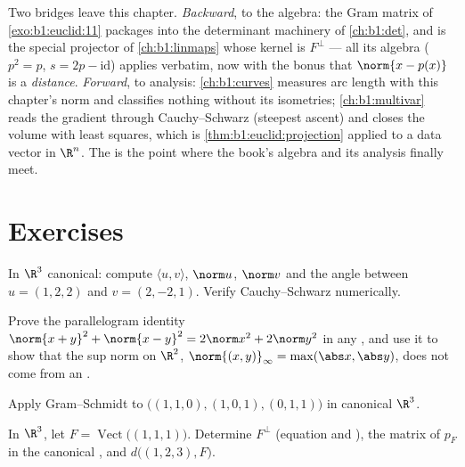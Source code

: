\begin{remark}
\label{rem:b1:euclid:perspectives}
Two bridges leave this chapter. \emph{Backward}, to the 
algebra: the Gram matrix of \cref{exo:b1:euclid:11} packages
 into the determinant machinery of
\cref{ch:b1:det}, and  is the special
projector of \cref{ch:b1:linmaps} whose kernel is
$F^\perp$ --- all its algebra ($p^2 = p$, $s = 2p -
\mathrm{id}$) applies verbatim, now with the bonus that $\norm{x
- p(x)}$ is a \emph{distance}. \emph{Forward}, to analysis:
\cref{ch:b1:curves} measures arc length with this chapter's
norm and classifies nothing without its isometries;
\cref{ch:b1:multivar} reads the gradient through
Cauchy--Schwarz (steepest ascent) and closes the volume with
least squares, which is \cref{thm:b1:euclid:projection} applied
to a data vector in $\R^n$. The  is the point
where the book's algebra and its analysis finally meet.
\end{remark}

\section{Exercises}

\begin{exercise}[$\star$]\label{exo:b1:euclid:1}
In $\R^3$ canonical: compute $\langle u, v\rangle$, $\norm u$,
$\norm v$ and the angle between $u = (1, 2, 2)$ and $v = (2, -2,
1)$. Verify Cauchy--Schwarz numerically.
\end{exercise}

\begin{exercise}[$\star$]\label{exo:b1:euclid:2}
Prove the parallelogram identity $\norm{x+y}^2 + \norm{x-y}^2 =
2\norm x^2 + 2\norm y^2$ in any , and use it to show
that the sup norm on $\R^2$, $\norm{(x,y)}_\infty = \max(\abs x,
\abs y)$, does not come from an .
\end{exercise}

\begin{exercise}[$\star$]\label{exo:b1:euclid:3}
Apply Gram--Schmidt to $\bigl((1,1,0), (1,0,1), (0,1,1)\bigr)$ in
canonical $\R^3$.
\end{exercise}

\begin{exercise}[$\star$]\label{exo:b1:euclid:4}
In $\R^3$, let $F = \operatorname{Vect}\bigl((1,1,1)\bigr)$.
Determine $F^\perp$ (equation and ), the matrix of $p_F$ in
the canonical , and $d\bigl((1, 2, 3), F\bigr)$.
\end{exercise}

